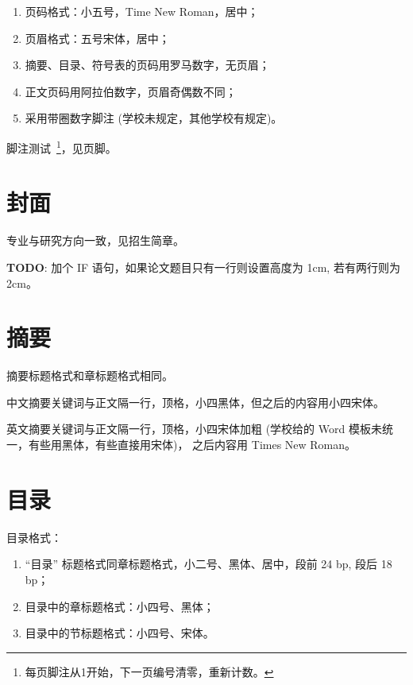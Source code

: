 \documentclass{swputhesis}
\begin{document}
\begin{enumerate}
	\item 页码格式：小五号，Time New Roman，居中；
	\item 页眉格式：五号宋体，居中；
	\item 摘要、目录、符号表的页码用罗马数字，无页眉；
	\item 正文页码用阿拉伯数字，页眉奇偶数不同；
	\item 采用带圈数字脚注 (学校未规定，其他学校有规定)。
\end{enumerate}

脚注测试~\footnote{每页脚注从1开始，下一页编号清零，重新计数。}，见页脚。

\section{封面}

专业与研究方向一致，见招生简章。

\textbf{TODO}: 加个 IF 语句，如果论文题目只有一行则设置高度为 1cm, 若有两行则为 2cm。

\section{摘要}

摘要标题格式和章标题格式相同。

中文摘要关键词与正文隔一行，顶格，小四黑体，但之后的内容用小四宋体。

英文摘要关键词与正文隔一行，顶格，小四宋体加粗 (学校给的 Word 模板未统一，有些用黑体，有些直接用宋体)， 
之后内容用 Times New Roman。

\section{目录}

目录格式：

\begin{enumerate}
	\item ``目录'' 标题格式同章标题格式，小二号、黑体、居中，段前 24 bp, 段后 18 bp；
	\item 目录中的章标题格式：小四号、黑体；
	\item 目录中的节标题格式：小四号、宋体。
\end{enumerate}
\end{document}
